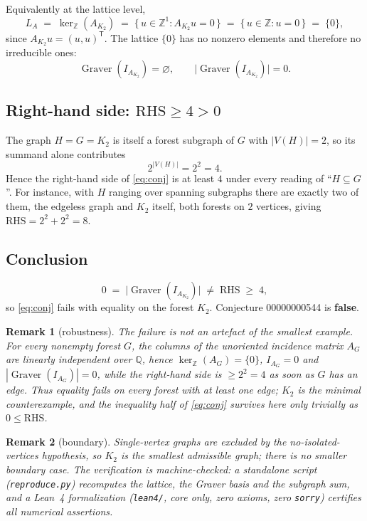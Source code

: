 \documentclass[11pt]{article}
\newtheorem{remark}{Remark}
\newcommand{\Z}{\mathbb{Z}}
\newcommand{\Graver}{\operatorname{Graver}}
\begin{document}
Equivalently at the lattice level,
\[
L_A \;=\; \ker_\Z(A_{K_2}) \;=\; \{\, u \in \Z^1 : A_{K_2} u = 0 \,\} \;=\; \{\, u \in \Z : u = 0 \,\} \;=\; \{0\},
\]
since $A_{K_2}u = (u, u)^{\mathsf T}$. The lattice $\{0\}$ has no nonzero elements and
therefore no irreducible ones:
\[
\Graver(I_{A_{K_2}}) = \varnothing, \qquad \bigl|\Graver(I_{A_{K_2}})\bigr| = 0 .
\]

\subsection{Right-hand side: $\mathrm{RHS} \ge 4 > 0$}

The graph $H = G = K_2$ is itself a forest subgraph of $G$ with $|V(H)| = 2$, so its
summand alone contributes
\[
2^{|V(H)|} = 2^2 = 4 .
\]
Hence the right-hand side of \eqref{eq:conj} is at least $4$ under every reading of
``$H \subseteq G$''. For instance, with $H$ ranging over spanning subgraphs there are
exactly two of them, the edgeless graph and $K_2$ itself, both forests on $2$ vertices,
giving $\mathrm{RHS} = 2^2 + 2^2 = 8$.

\subsection{Conclusion}

\[
0 \;=\; \bigl|\Graver(I_{A_{K_2}})\bigr| \;\neq\; \mathrm{RHS} \;\ge\; 4 ,
\]
so \eqref{eq:conj} fails with equality on the forest $K_2$. Conjecture 00000000544 is
\textbf{false}.

\begin{remark}[robustness]\label{rem:robust}
The failure is not an artefact of the smallest example. For \emph{every} nonempty
forest $G$, the columns of the unoriented incidence matrix $A_G$ are linearly
independent over $\mathbb{Q}$, hence $\ker_\Z(A_G) = \{0\}$, $I_{A_G} = 0$ and
$|\Graver(I_{A_G})| = 0$, while the right-hand side is $\ge 2^2 = 4$ as soon as $G$
has an edge. Thus equality fails on \emph{every} forest with at least one edge;
$K_2$ is the minimal counterexample, and the inequality half of \eqref{eq:conj}
survives here only trivially as $0 \le \mathrm{RHS}$.
\end{remark}

\begin{remark}[boundary]
Single-vertex graphs are excluded by the no-isolated-vertices hypothesis, so $K_2$ is
the smallest admissible graph; there is no smaller boundary case. The verification is
machine-checked: a standalone script (\texttt{reproduce.py}) recomputes the lattice,
the Graver basis and the subgraph sum, and a Lean~4 formalization (\texttt{lean4/},
core only, zero axioms, zero \texttt{sorry}) certifies all numerical assertions.
\end{remark}
\end{document}
